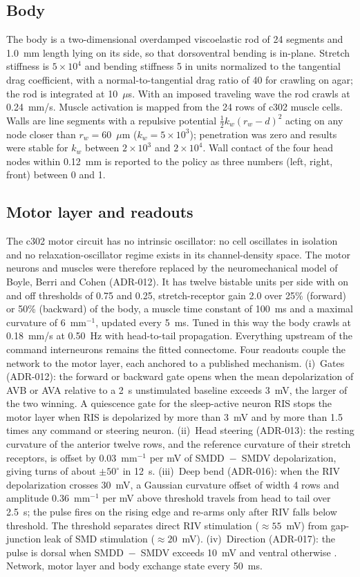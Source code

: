 \documentclass[11pt,a4paper]{article}
\begin{document}
\subsection*{Body}
The body is a two-dimensional overdamped viscoelastic rod of 24 segments and 1.0~mm length lying on its side, so that dorsoventral bending is in-plane. Stretch stiffness is $5\times10^{4}$ and bending stiffness 5 in units normalized to the tangential drag coefficient, with a normal-to-tangential drag ratio of 40 for crawling on agar; the rod is integrated at 10~$\mu$s. With an imposed traveling wave the rod crawls at 0.24~mm/s. Muscle activation is mapped from the 24 rows of c302 muscle cells. Walls are line segments with a repulsive potential $\tfrac12 k_w (r_w - d)^2$ acting on any node closer than $r_w = 60$~$\mu$m ($k_w = 5\times10^{3}$); penetration was zero and results were stable for $k_w$ between $2\times10^{3}$ and $2\times10^{4}$. Wall contact of the four head nodes within 0.12~mm is reported to the policy as three numbers (left, right, front) between 0 and 1.

\subsection*{Motor layer and readouts}
The c302 motor circuit has no intrinsic oscillator: no cell oscillates in isolation and no relaxation-oscillator regime exists in its channel-density space. The motor neurons and muscles were therefore replaced by the neuromechanical model of Boyle, Berri and Cohen \cite{r7} (ADR-012). It has twelve bistable units per side with on and off thresholds of 0.75 and 0.25, stretch-receptor gain 2.0 over 25\% (forward) or 50\% (backward) of the body, a muscle time constant of 100~ms and a maximal curvature of 6~mm$^{-1}$, updated every 5~ms. Tuned in this way the body crawls at 0.18~mm/s at 0.50~Hz with head-to-tail propagation. Everything upstream of the command interneurons remains the fitted connectome. Four readouts couple the network to the motor layer, each anchored to a published mechanism. (i)~Gates (ADR-012): the forward or backward gate opens when the mean depolarization of AVB or AVA relative to a 2~s unstimulated baseline exceeds 3~mV, the larger of the two winning. A quiescence gate for the sleep-active neuron RIS \cite{r17} stops the motor layer when RIS is depolarized by more than 3~mV and by more than 1.5 times any command or steering neuron. (ii)~Head steering (ADR-013): the resting curvature of the anterior twelve rows, and the reference curvature of their stretch receptors, is offset by 0.03~mm$^{-1}$ per mV of SMDD~$-$~SMDV depolarization, giving turns of about $\pm 50^\circ$ in 12~s. (iii)~Deep bend (ADR-016): when the RIV depolarization crosses 30~mV, a Gaussian curvature offset of width 4 rows and amplitude 0.36~mm$^{-1}$ per mV above threshold travels from head to tail over 2.5~s; the pulse fires on the rising edge and re-arms only after RIV falls below threshold. The threshold separates direct RIV stimulation ($\approx 55$~mV) from gap-junction leak of SMD stimulation ($\approx 20$~mV). (iv)~Direction (ADR-017): the pulse is dorsal when SMDD~$-$~SMDV exceeds 10~mV and ventral otherwise \cite{r11}. Network, motor layer and body exchange state every 50~ms.
\end{document}
